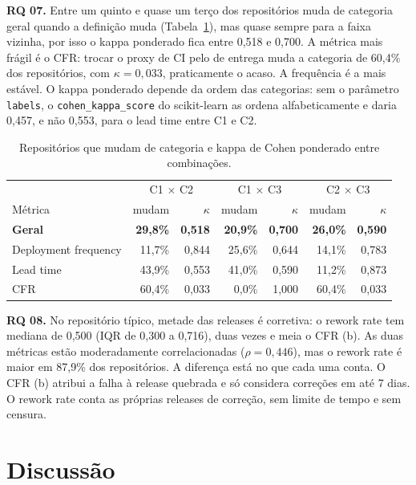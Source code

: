 \documentclass[12pt]{article}
\begin{document}
\textbf{RQ 07.} Entre um quinto e quase um terço dos repositórios muda de categoria geral quando a definição muda (Tabela~\ref{tab:sensibilidade}), mas quase sempre para a faixa vizinha, por isso o kappa ponderado fica entre 0,518 e 0,700. A métrica mais frágil é o CFR: trocar o proxy de CI pelo de entrega muda a categoria de 60,4\% dos repositórios, com $\kappa = 0{,}033$, praticamente o acaso. A frequência é a mais estável. O kappa ponderado depende da ordem das categorias: sem o parâmetro \texttt{labels}, o \texttt{cohen\_kappa\_score} do scikit-learn as ordena alfabeticamente e daria 0,457, e não 0,553, para o lead time entre C1 e C2.

\begin{table}[ht]
\centering
\caption{Repositórios que mudam de categoria e kappa de Cohen ponderado entre combinações.}
\label{tab:sensibilidade}
\small
\begin{tabular}{lrrrrrr}
\hline
 & \multicolumn{2}{c}{C1 $\times$ C2} & \multicolumn{2}{c}{C1 $\times$ C3} & \multicolumn{2}{c}{C2 $\times$ C3} \\
Métrica & mudam & $\kappa$ & mudam & $\kappa$ & mudam & $\kappa$ \\
\hline
\textbf{Geral} & \textbf{29,8\%} & \textbf{0,518} & \textbf{20,9\%} & \textbf{0,700} & \textbf{26,0\%} & \textbf{0,590} \\
Deployment frequency & 11,7\% & 0,844 & 25,6\% & 0,644 & 14,1\% & 0,783 \\
Lead time & 43,9\% & 0,553 & 41,0\% & 0,590 & 11,2\% & 0,873 \\
CFR & 60,4\% & 0,033 & 0,0\% & 1,000 & 60,4\% & 0,033 \\
\hline
\end{tabular}
\end{table}

\textbf{RQ 08.} No repositório típico, metade das releases é corretiva: o rework rate tem mediana de 0,500 (IQR de 0,300 a 0,716), duas vezes e meia o CFR (b). As duas métricas estão moderadamente correlacionadas ($\rho = 0{,}446$), mas o rework rate é maior em 87,9\% dos repositórios. A diferença está no que cada uma conta. O CFR (b) atribui a falha à release quebrada e só considera correções em até 7 dias. O rework rate conta as próprias releases de correção, sem limite de tempo e sem censura.

\section{Discussão}
\end{document}
